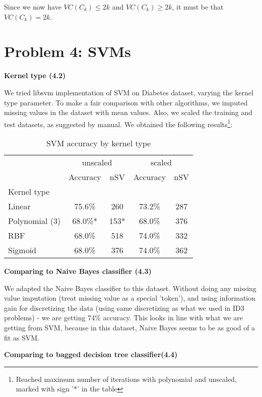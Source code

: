 \documentclass{article}
\begin{document}
Since we now have $VC(C_k) \leq 2k$ and $VC(C_k) \geq 2k$, it must be that $VC(C_k) = 2k$.

\section*{Problem 4: SVMs}

\textbf{Kernel type (4.2)}

We tried libsvm implementation of SVM on Diabetes dataset, varying the kernel type parameter.
To make a fair comparison with other algorithms, we imputed missing values in the dataset with mean values. Also, we scaled the training and test datasets, as suggested by manual. We obtained the following results\footnote{Reached maximum number of iterations with polynomial and unscaled, marked with sign '*' in the table}:

\begin {table}[h]
\begin{center}
\caption {SVM accuracy by kernel type \label{kernel}}
\begin{tabular}{lcccc}
\toprule
{} &  \multicolumn{2}{c}{unscaled} & \multicolumn{2}{c}{scaled} \\
{} & Accuracy & nSV & Accuracy & nSV\\
Kernel type      &  &  & & \\
\midrule
Linear 				& 75.6\% & 260 & 73.2\% & 287 \\
Polynomial (3)         & 68.0\%* & 153* & 68.0\% & 376 \\
RBF 				& 68.0\% & 518 & 74.0\% & 332 \\
Sigmoid           	 	& 68.0\% & 376 & 74.0\% & 362 \\

\bottomrule
\end{tabular}
\end{center}
\end {table}

\textbf{Comparing to Naive Bayes classifier (4.3)}

We adapted the Naive Bayes classifier to this dataset. Without doing any missing value imputation (treat missing value as a special 'token'), and using information gain for discretizing the data (using same discretizing as what we used in ID3 problems) - we are getting 74\% accuracy. This looks in line with what we are getting from SVM, because in this dataset, Naive Bayes seems to be as good of a fit as SVM.

\textbf{Comparing to bagged decision tree classifier(4.4)}
\end{document}
